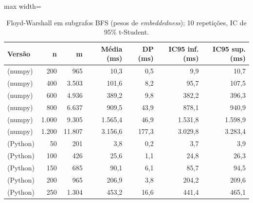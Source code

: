 \begin{table}[!htb]
\centering
\caption{Floyd-Warshall em subgrafos BFS (pesos de \emph{embeddedness}); 10 repetições, IC de 95\% t-Student.}
\label{tab:floyd}
\begin{adjustbox}{max width=\linewidth}
\begin{tabular}{lrrrrrr}
\toprule
Versão & n & m & Média (ms) & DP (ms) & IC95 inf. (ms) & IC95 sup. (ms) \\
\midrule
(numpy) & 200 & 965 & 10,3 & 0,5 & 9,9 & 10,7 \\
(numpy) & 400 & 3.503 & 101,6 & 8,2 & 95,7 & 107,5 \\
(numpy) & 600 & 4.936 & 389,2 & 9,8 & 382,2 & 396,3 \\
(numpy) & 800 & 6.637 & 909,5 & 43,9 & 878,1 & 940,9 \\
(numpy) & 1.000 & 9.305 & 1.565,4 & 46,9 & 1.531,8 & 1.598,9 \\
(numpy) & 1.200 & 11.807 & 3.156,6 & 177,3 & 3.029,8 & 3.283,4 \\
(Python) & 50 & 201 & 3,8 & 0,2 & 3,7 & 3,9 \\
(Python) & 100 & 426 & 25,6 & 1,1 & 24,8 & 26,3 \\
(Python) & 150 & 685 & 90,1 & 6,1 & 85,7 & 94,5 \\
(Python) & 200 & 965 & 206,9 & 3,8 & 204,2 & 209,6 \\
(Python) & 250 & 1.304 & 453,2 & 16,6 & 441,4 & 465,1 \\
\bottomrule
\end{tabular}
\end{adjustbox}
\end{table}

